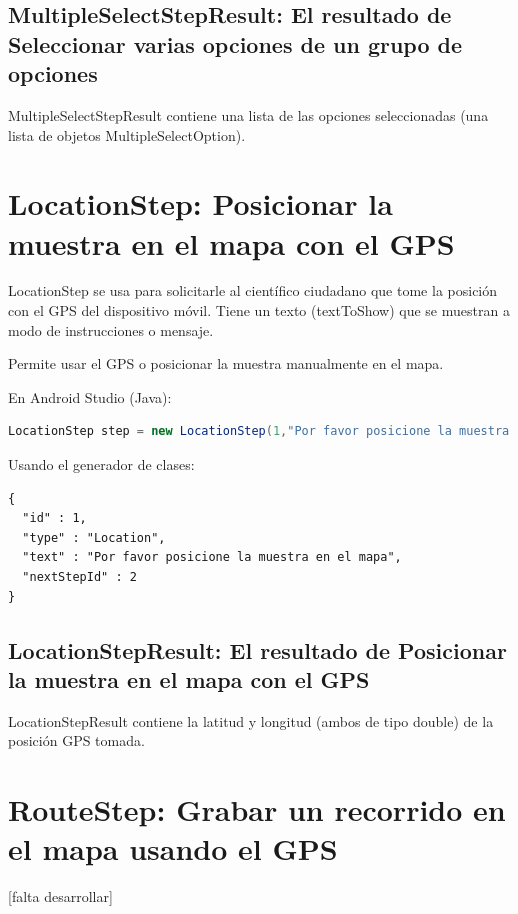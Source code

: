 \subsection{MultipleSelectStepResult: El resultado de Seleccionar varias opciones de un grupo de opciones}
MultipleSelectStepResult contiene una lista de las opciones seleccionadas (una lista de objetos MultipleSelectOption).





\section{LocationStep: Posicionar la muestra en el mapa con el GPS}
LocationStep se usa para solicitarle al científico ciudadano que tome la posición con el GPS del dispositivo móvil. Tiene un texto (textToShow) que se muestran a modo de instrucciones o mensaje. 

Permite usar el GPS o posicionar la muestra manualmente en el mapa.

En Android Studio (Java):
\begin{lstlisting}[language=Java, frame=tlb]	
LocationStep step = new LocationStep(1,"Por favor posicione la muestra en el mapa",2); 
\end{lstlisting}

Usando el generador de clases:
\begin{lstlisting}[language=XML, frame=tlb]	
{
  "id" : 1,
  "type" : "Location",
  "text" : "Por favor posicione la muestra en el mapa",
  "nextStepId" : 2
}
\end{lstlisting}

\subsection{LocationStepResult: El resultado de Posicionar la muestra en el mapa con el GPS}
LocationStepResult contiene la latitud y longitud (ambos de tipo double) de la posición GPS tomada.


\section{RouteStep: Grabar un recorrido en el mapa usando el GPS}
[falta desarrollar]

